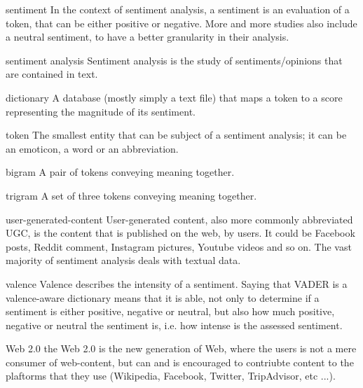 	\begin{glossy}
		\item[sentiment] In the context of sentiment analysis, a sentiment is an evaluation of a token, that can be either positive or negative. More and more studies also include a neutral sentiment, to have a better granularity in their analysis.
		\item [sentiment analysis] Sentiment analysis is the study of sentiments/opinions that are contained in text.
		\item [dictionary] A database (mostly simply a text file) that maps a token to a score representing the magnitude of its sentiment.
		\item [token] The smallest entity that can be subject of a sentiment analysis; it can be an emoticon, a word or an abbreviation.
		\item [bigram] A pair of tokens conveying meaning together.
		\item [trigram] A set of three tokens conveying meaning together.
		\item [user-generated-content] User-generated content, also more commonly abbreviated UGC, is the content that is published on the web, by users. It could be Facebook posts, Reddit comment, Instagram pictures, Youtube videos and so on. The vast majority of sentiment analysis deals with textual data.
		\item [valence] Valence describes the intensity of a sentiment. Saying that VADER is a valence-aware dictionary means that it is able, not only to determine if a sentiment is either positive, negative or neutral, but also how much positive, negative or neutral the sentiment is, i.e. how intense is the assessed sentiment.
		\item [Web 2.0] the Web 2.0 is the new generation of Web, where the users is not a mere consumer of web-content, but can and is encouraged to contriubte content to the plaftorms that they use (Wikipedia, Facebook, Twitter, TripAdvisor, etc ...).
	\end{glossy}
	